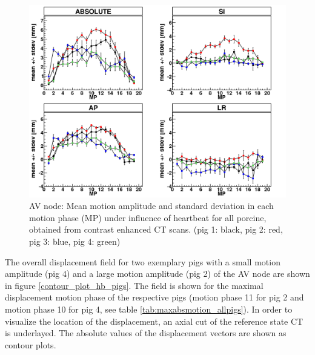 \vspace*{-0.4cm}

\begin{figure}[H]
\begin{center}
 \includegraphics[scale=0.22]{./teile/results_porcine/Mayo_AV_HB.png}
\caption{AV node: Mean motion amplitude and standard deviation in each motion phase (MP) under influence of heartbeat for all porcine, 
obtained from contrast enhanced CT scans. (pig 1: black, pig 2: red, pig 3: blue, pig 4: green) }
\label{fig:motion_hb_all_av}
\end{center}
\end{figure}

\newpage

The overall displacement field for two exemplary pigs with a small motion amplitude (pig 4) and a large motion amplitude (pig 2) of the 
AV node are shown in figure \ref{contour_plot_hb_pigs}. The field is shown for the maximal displacement motion phase of the respective pigs 
(motion phase 11 for pig 2 and motion phase 10 for pig 4, see table \ref{tab:maxabsmotion_allpigs}). 
In order to visualize the location of the displacement, an axial cut of the reference state CT is 
underlayed. The absolute values of the displacement vectors are shown as contour plots. 


